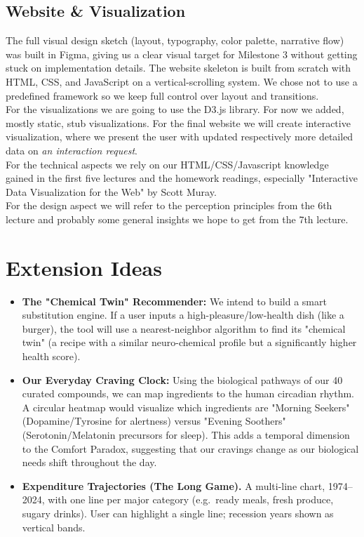 \documentclass[10pt,conference,compsocconf]{IEEEtran}
\begin{document}
\subsection*{Website \& Visualization}
The full visual design sketch (layout, typography, color palette, narrative flow) was built in Figma, giving us a clear visual target for Milestone 3 without getting stuck on implementation details. The website skeleton is built from scratch with HTML, CSS, and JavaScript on a vertical-scrolling system. We chose not to use a predefined framework so we keep full control over layout and transitions. \\
For the visualizations we are going to use the D3.js library. For now we added, mostly static, stub visualizations. For the final website we will create interactive visualization, where we present the user with updated respectively more detailed data on \textit{an interaction request}.\\
For the technical aspects we rely on our HTML/CSS/Javascript knowledge gained in the first five lectures and the homework readings, especially "Interactive Data Visualization for the Web" by Scott Muray. \\
For the design aspect we will refer to the perception principles from the 6th lecture and probably some general insights we hope to get from the 7th lecture.


\section{Extension Ideas}

\begin{itemize}
    \item \textbf{The "Chemical Twin" Recommender:} We intend to build a smart substitution engine. If a user inputs a high-pleasure/low-health dish (like a burger), the tool will use a nearest-neighbor algorithm to find its "chemical twin" (a recipe with a similar neuro-chemical profile but a significantly higher health score). 
    \item \textbf{Our Everyday Craving Clock:} Using the biological pathways of our 40 curated compounds, we can map ingredients to the human circadian rhythm. A circular heatmap would visualize which ingredients are "Morning Seekers" (Dopamine/Tyrosine for alertness) versus "Evening Soothers" (Serotonin/Melatonin precursors for sleep). This adds a temporal dimension to the Comfort Paradox, suggesting that our cravings change as our biological needs shift throughout the day. 
    \item \textbf{Expenditure Trajectories (The Long Game).} A multi-line chart, 1974--2024, with one line per major category (e.g.\ ready meals, fresh produce, sugary drinks). User can highlight a single line; recession years shown as vertical bands.
\end{itemize}
\end{document}
